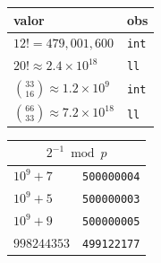 \hspace{8pt}%
\begin{minipage}[c]{0.44\linewidth}
\begin{tabular}{ll}
\toprule
valor & obs \\
\midrule
$12!=479{,}001{,}600$                        & \texttt{int} \\
$20!\approx 2.4\!\times\!10^{18}$            & \texttt{ll}  \\
$\binom{33}{16}\!\approx\!1.2\!\times\!10^9$ & \texttt{int} \\
$\binom{66}{33}\!\approx\!7.2\!\times\!10^{18}$ & \texttt{ll} \\
\bottomrule
\end{tabular}

\vspace{4pt}

\begin{tabular}{ll}
\toprule
\multicolumn{2}{c}{$2^{-1} \bmod p$} \\
\midrule
$10^9{+}7$  & \texttt{500000004} \\
$10^9{+}5$  & \texttt{500000003} \\
$10^9{+}9$  & \texttt{500000005} \\
$998244353$ & \texttt{499122177} \\
\bottomrule
\end{tabular}
\end{minipage}

\normalsize
